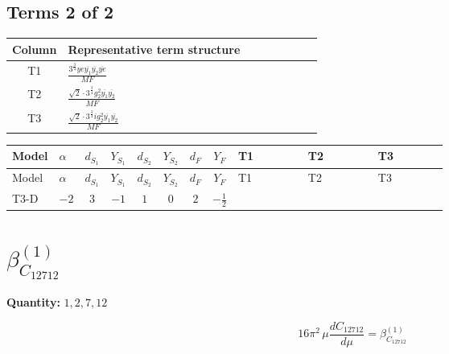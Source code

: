 \documentclass[8pt]{article}
\begin{document}
\begin{landscape}
\subsection*{Terms 2 of 2}
\begin{center}
\begin{tabular}{@{}c >{\raggedright\arraybackslash}p{0.82\linewidth}@{}}
\toprule
Column & Representative term structure \\
\midrule
T1 & \(\displaystyle \frac{3^{\frac{3}{4}} ye \overline{y_{1}} \overline{y_{2}} \overline{ye}}{MF}\) \\
\midrule
T2 & \(\displaystyle \frac{\sqrt{2} \cdot 3^{\frac{3}{4}} g_{2}^{2} \overline{y_{1}} \overline{y_{2}}}{MF}\) \\
\midrule
T3 & \(\displaystyle \frac{\sqrt{2} \cdot 3^{\frac{3}{4}} i g_{2}^{2} \overline{y_{1}} \overline{y_{2}}}{MF}\) \\
\midrule
\bottomrule
\end{tabular}
\end{center}
\smallskip
\tiny
\begin{longtable}{@{}llcccccc >{\raggedright\arraybackslash}p{0.21\linewidth} >{\raggedright\arraybackslash}p{0.21\linewidth} >{\raggedright\arraybackslash}p{0.21\linewidth}@{}}
\toprule
Model & $\alpha$ & $d_{S_1}$ & $Y_{S_1}$ & $d_{S_2}$ & $Y_{S_2}$ & $d_F$ & $Y_F$ & T1 & T2 & T3 \\
\midrule
\endfirsthead
\toprule
Model & $\alpha$ & $d_{S_1}$ & $Y_{S_1}$ & $d_{S_2}$ & $Y_{S_2}$ & $d_F$ & $Y_F$ & T1 & T2 & T3 \\
\midrule
\endhead
T3-D & $-2$ & $3$ & $-1$ & $1$ & $0$ & $2$ & $-\frac{1}{2}$ & \scriptsize\adjustbox{max width=\linewidth}{$\begin{gathered} - \frac{3^{\frac{3}{4}} ye \overline{y_{1}} \overline{y_{2}} \overline{ye}}{12 MF}\end{gathered}$} & \scriptsize\adjustbox{max width=\linewidth}{$\begin{gathered} \frac{\sqrt{2} \cdot 3^{\frac{3}{4}} g_{2}^{2} \overline{y_{1}} \overline{y_{2}}}{6 MF}\end{gathered}$} & \scriptsize\adjustbox{max width=\linewidth}{$\begin{gathered} \frac{\sqrt{2} \cdot 3^{\frac{3}{4}} i g_{2}^{2} \overline{y_{1}} \overline{y_{2}}}{6 MF}\end{gathered}$} \\
\midrule
\bottomrule
\end{longtable}
\clearpage
\section*{$\beta_{C_{12712}}^{(1)}$}
\noindent\textbf{Quantity: }$\mathrm{1,2,7,12}$\par\smallskip
\[16\pi^2\,\mu\frac{d C_{12712}}{d\mu}=\beta_{C_{12712}}^{(1)}\]

\end{landscape}
\end{document}
